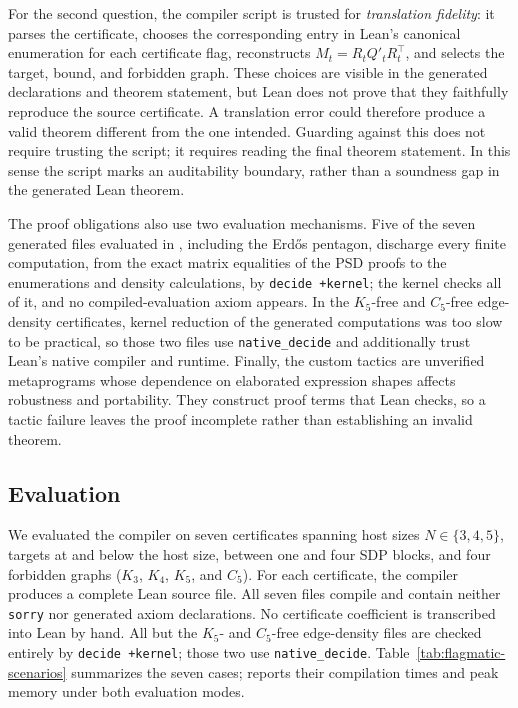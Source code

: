 \documentclass{article}
\newcommand{\lean}[1]{\texttt{#1}}
\begin{document}
For the second question, the compiler script is trusted for \emph{translation
fidelity}: it parses the
certificate, chooses the corresponding entry in Lean's canonical enumeration
for each certificate flag, reconstructs $M_t=R_tQ'_tR_t^\top$, and selects the
target, bound, and forbidden graph.
These choices are visible in the generated declarations and theorem statement,
but Lean does not prove that they faithfully reproduce the source certificate.
A translation error could therefore produce a valid theorem different from
the one intended.  Guarding against this does not require trusting the
script; it requires reading the final theorem statement.  In this sense the
script marks an auditability boundary, rather than a soundness gap in the
generated Lean theorem.

The proof obligations also use two evaluation mechanisms.  Five of the seven
generated files evaluated in , including the Erd\H{o}s
pentagon, discharge every finite
computation, from the exact matrix equalities of the PSD proofs to the
enumerations and density calculations, by \lean{decide +kernel}; the kernel
checks all of it, and no compiled-evaluation axiom appears.  In the $K_5$-free
and $C_5$-free edge-density certificates, kernel reduction of the generated
computations was too slow to be practical, so those two files use
\lean{native\_decide} and additionally trust Lean's native compiler and
runtime.  Finally, the custom
tactics are unverified metaprograms whose dependence on elaborated expression
shapes affects robustness and portability.  They construct proof terms that
Lean checks, so a tactic failure leaves the proof incomplete rather than
establishing an invalid theorem.

\subsection{Evaluation}
\label{sec:results}\label{sec:flagmatic-scenarios}

We evaluated the compiler on seven certificates spanning host sizes
$N\in\{3,4,5\}$, targets at and below the host size, between one and four SDP
blocks, and four
forbidden graphs ($K_3$, $K_4$, $K_5$, and $C_5$).  For each certificate,
the compiler produces a complete Lean source file.  All seven files compile
and contain neither \lean{sorry} nor generated axiom declarations.  No
certificate coefficient is transcribed into Lean by hand.  All but the
$K_5$- and $C_5$-free edge-density files are checked entirely by
\lean{decide +kernel}; those two use
\lean{native\_decide}.
Table~\ref{tab:flagmatic-scenarios} summarizes the seven cases;
 reports their compilation times and peak memory
under both evaluation modes.
\end{document}
